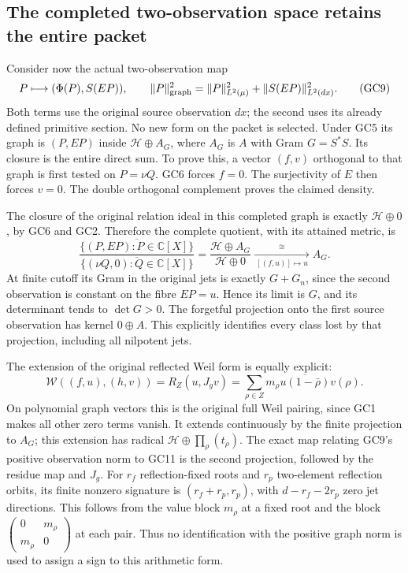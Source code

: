 \documentclass[11pt,a4paper]{article}
\theoremstyle{definition}\newtheorem{definition}[theorem]{Definition}
\newcommand{\C}{\mathbb C}\newcommand{\R}{\mathbb R}
\begin{document}
\subsection{The completed two-observation space retains the entire packet}
Consider now the actual two-observation map
\[
 P\longmapsto(\Phi(P),S(EP)),\qquad
 \|P\|_{\rm graph}^2=\|P\|_{L^2(\mu)}^2+\|S(EP)\|_{L^2(dx)}^2.
 \tag{GC9}\label{gc:graph}
\]
Both terms use the original source observation $dx$; the second
uses its already defined primitive section. No new form on the
packet is selected. Under GC5 its graph is $(P,EP)$ inside
$\mathcal H\oplus A_G$, where $A_G$ is $A$ with Gram $G=S^*S$.
Its closure is the entire direct sum. To prove this, a vector
$(f,v)$ orthogonal to that graph is first tested on $P=\nu Q$.
GC6 forces $f=0$. The surjectivity of $E$ then forces $v=0$.
The double orthogonal complement proves the claimed density.

The closure of the original relation ideal in this completed
graph is exactly $\mathcal H\oplus0$, by GC6 and GC2. Therefore
the complete quotient, with its attained metric, is
\[
 \frac{\overline{\{(P,EP):P\in\C[X]\}}}
      {\overline{\{(\nu Q,0):Q\in\C[X]\}}}
       =\frac{\mathcal H\oplus A_G}{\mathcal H\oplus0}
       \xrightarrow[\ [(f,u)]\mapsto u\ ]{\ \cong\ }A_G.
 \tag{GC10}\label{gc:completed-quotient}
\]
At finite cutoff its Gram in the original jets is exactly
$G+G_n$, since the second observation is constant on the fibre
$EP=u$. Hence its limit is $G$, and its determinant tends to
$\det G>0$. The forgetful projection onto the first source
observation has kernel $0\oplus A$. This explicitly identifies
every class lost by that projection, including all nilpotent jets.

The extension of the original reflected Weil form is equally
explicit:
\[
 \mathcal W((f,u),(h,v))
   =R_Z(u,J_gv)
   =\sum_{\rho\in Z}m_\rho\overline{u(1-\bar\rho)}v(\rho).
 \tag{GC11}\label{gc:weil}
\]
On polynomial graph vectors this is the original full Weil
pairing, since GC1 makes all other zero terms vanish. It extends
continuously by the finite projection to $A_G$; this extension
has radical $\mathcal H\oplus\prod_\rho(t_\rho)$.
The exact map relating GC9's positive observation norm to GC11
is the second projection, followed by the residue map and
$J_g$. For $r_f$ reflection-fixed roots and $r_p$ two-element
reflection orbits, its finite nonzero signature is
$(r_f+r_p,r_p)$, with $d-r_f-2r_p$ zero jet directions.
This follows from the value block $m_\rho$ at a fixed root and
the block $\left(\begin{smallmatrix}0&m_\rho\\m_\rho&0\end{smallmatrix}\right)$
at each pair. Thus no identification with the positive graph
norm is used to assign a sign to this arithmetic form.
\end{document}
